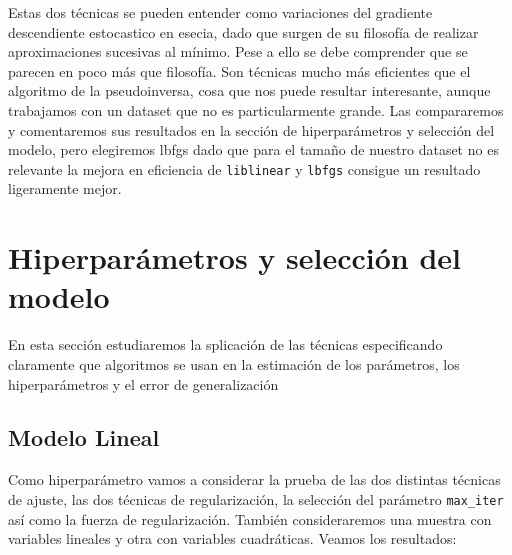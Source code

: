 \documentclass[11pt,a4paper]{article}
\begin{document}
Estas dos técnicas se pueden entender como variaciones del gradiente descendiente estocastico en esecia, dado que surgen de su filosofía de realizar aproximaciones sucesivas al mínimo. Pese a ello se debe comprender que se parecen en poco más que filosofía. Son técnicas mucho más eficientes que el algoritmo de la pseudoinversa, cosa que nos puede resultar interesante, aunque trabajamos con un dataset que no es particularmente grande. Las compararemos y comentaremos sus resultados  en la sección de hiperparámetros y selección del modelo, pero elegiremos lbfgs dado que para el tamaño de nuestro dataset no es relevante la mejora en eficiencia de \texttt{liblinear} y \texttt{lbfgs} consigue un resultado ligeramente mejor.


\section{Hiperparámetros y selección del modelo}
 En esta sección estudiaremos la splicación de las técnicas especificando claramente que algoritmos se usan en la estimación de los parámetros, los hiperparámetros y el error de generalización
 
\subsection{Modelo Lineal}

Como hiperparámetro vamos a considerar la prueba de las dos distintas técnicas de ajuste, las dos técnicas de regularización, la selección del parámetro \texttt{max\_iter} así como la fuerza de regularización. También consideraremos una muestra con variables lineales y otra con variables cuadráticas. Veamos los resultados:\\
\end{document}
